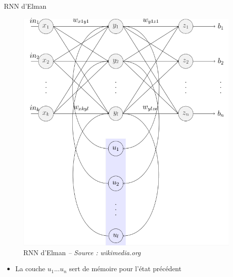 \begin{frame}{RNN d'Elman}
    \begin{figure}
        \includegraphics[height=.65\textheight,width=\textwidth,keepaspectratio]{images/Elman_srnn}
        \caption{RNN d'Elman {\scriptsize\it -- Source : wikimedia.org}}
    \end{figure}
    \vspace{-.5cm}
	\begin{itemize} 
		\item La couche $u_1 ... u_n$ sert de mémoire pour l'état précédent 
	\end{itemize}
\end{frame}

